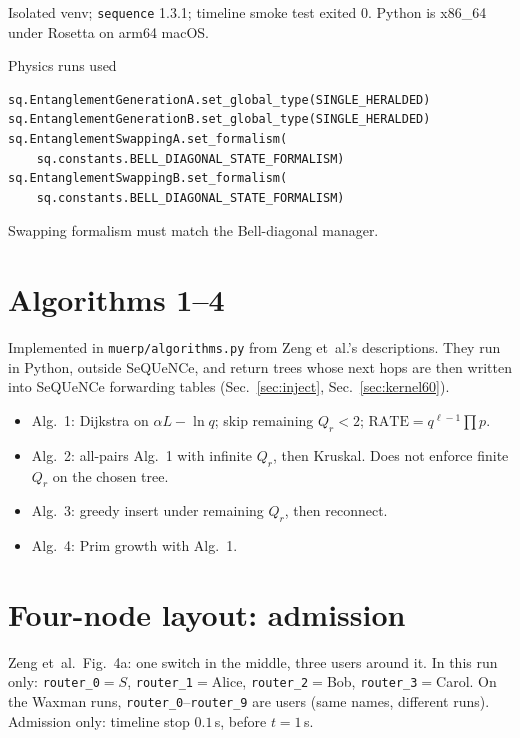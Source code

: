 \documentclass[11pt]{article}
\begin{document}
Isolated venv; \texttt{sequence} 1.3.1; timeline smoke test exited 0.
Python is x86\_64 under Rosetta on arm64 macOS.

Physics runs used
\begin{verbatim}
sq.EntanglementGenerationA.set_global_type(SINGLE_HERALDED)
sq.EntanglementGenerationB.set_global_type(SINGLE_HERALDED)
sq.EntanglementSwappingA.set_formalism(
    sq.constants.BELL_DIAGONAL_STATE_FORMALISM)
sq.EntanglementSwappingB.set_formalism(
    sq.constants.BELL_DIAGONAL_STATE_FORMALISM)
\end{verbatim}
Swapping formalism must match the Bell-diagonal manager.

\section{Algorithms 1--4}

Implemented in \texttt{muerp/algorithms.py} from Zeng et~al.'s descriptions.
They run in Python, outside SeQUeNCe, and return trees whose next hops are then written into SeQUeNCe forwarding tables (Sec.~\ref{sec:inject}, Sec.~\ref{sec:kernel60}).

\begin{itemize}
\item Alg.~1: Dijkstra on $\alpha L-\ln q$; skip remaining $Q_r<2$; $\mathrm{RATE}=q^{\ell-1}\prod p$.
\item Alg.~2: all-pairs Alg.~1 with infinite $Q_r$, then Kruskal. Does not enforce finite $Q_r$ on the chosen tree.
\item Alg.~3: greedy insert under remaining $Q_r$, then reconnect.
\item Alg.~4: Prim growth with Alg.~1.
\end{itemize}

\section{Four-node layout: admission}
\label{sec:fig4a}

Zeng et~al.\ Fig.~4a: one switch in the middle, three users around it.
In this run only: \texttt{router\_0}${=}S$, \texttt{router\_1}${=}$Alice, \texttt{router\_2}${=}$Bob, \texttt{router\_3}${=}$Carol.
On the Waxman runs, \texttt{router\_0}--\texttt{router\_9} are users (same names, different runs).
Admission only: timeline stop $0.1$\,s, before $t=1$\,s.
\end{document}
